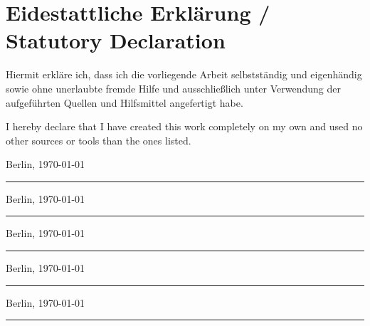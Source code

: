 \chapter*{\LARGE Eidestattliche Erklärung / Statutory Declaration}
Hiermit erkläre ich, dass ich die vorliegende Arbeit selbstständig und eigenhändig sowie ohne unerlaubte fremde Hilfe und ausschließlich unter Verwendung der aufgeführten Quellen und Hilfsmittel angefertigt habe.
\vspace{2em}

\noindent I hereby declare that I have created this work completely on my own and used no other sources or tools than the ones listed.

\vspace{30 mm}
\begin{flushright}


Berlin, \today \hspace{15 mm} 
\rule{90mm}{1pt}\newline\newline
Berlin, \today \hspace{15 mm} 
\rule{90mm}{1pt}\newline\newline
Berlin, \today \hspace{15 mm} 
\rule{90mm}{1pt}\newline\newline
Berlin, \today \hspace{15 mm} 
\rule{90mm}{1pt}\newline\newline
Berlin, \today \hspace{15 mm} 
\rule{90mm}{1pt}\newline\newline
\end{flushright}
